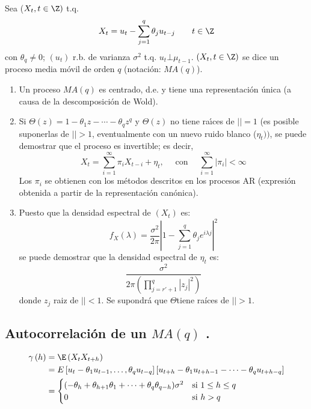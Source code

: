\begin{definicion}
Sea ($X_{t}, t\in \Z)$ t.q.
\[
X_{t} =u_{t} -\sum_{j=1}^q {\theta_{j} u_{t-j} } 
\qquad
t\in \Z
\]
con $\theta_{q} \ne 0$; $\left( {u_{t} } \right)$ r.b. de varianza $\sigma^{2}$ t.q. $u_{t} \bot \mu_{t-1} $. $\left( {X_{t} ,t\in \Z} \right)$ se dice un proceso media m\'{o}vil de orden $q$ (notaci\'{o}n: $MA(q)$).
\end{definicion}

\begin{observacion}
\quad 
\begin{enumerate}
\item Un proceso $MA(q)$ es centrado, d.e. y tiene una representaci\'{o}n \'{u}nica (a causa de la descomposici\'{o}n de Wold).

\item Si $\Theta \left( z \right)=1-\theta_{1} z-\cdots-\theta_{q} z^{q}$ y $\Theta (z)$ no tiene ra\'{\i}ces de $\left| \right|=1$ (es posible suponerlas de $\left| \right|>1$, eventualmente con un nuevo ruido blanco ($\eta_{t}))$, se puede demostrar que el proceso es invertible; es decir,
\[
X_{t}=\sum_{i=1}^\infty {\pi_{i}X_{t-i}} +\eta_{t},  \quad\text{ con }\quad  \sum_{i=1}^\infty \left| 
\pi_{i} \right| <\infty  
\]
Los $\pi_{i}$ se obtienen con los m\'{e}todos descritos en los procesos AR (expresi\'{o}n obtenida a partir de la representaci\'{o}n can\'{o}nica).

\item Puesto que la densidad espectral de $(X_{{t}})$ es:
\[
f_{X} \left( \lambda \right)=\frac{\sigma^{2}}{2\pi }\left| {1-\sum_{j=1}^q {\theta_{j} e^{i\lambda j}} } \right|^{2}
\]
se puede demostrar que la densidad espectral de $\eta_{t}$ es:
\[
\frac{\sigma^{2}}{2\pi \left( {\prod_{j={r}'+1}^{q} \left| 
{z_{j} } \right|^{2}} \right)}
\]
donde $z_{j}$ raiz de $\left| \right|<1$. Se supondr\'{a} que $\Theta $tiene ra\'{i}ces de $\left| \right|>1$. 
\end{enumerate}
\end{observacion}

\subsection{Autocorrelaci\'{o}n de un $MA(q)$ .}
\begin{align*}
\gamma \left( h \right)
	 &=\E\left( {X_{t} X_{t+h} } \right)\\
	 &=E\left[ {u_{t} -\theta_{1} u_{t-1} ,\ldots,\theta_{q} u_{t-q} } \right]\left[ {u_{t+h} -\theta_{1} u_{t+h-1} -\dots-\theta_{q} u_{t+h-q} } \right]\\
	 &=\begin{cases}
	    (-\theta_{h} +\theta_{h+1} \theta_{1} +\cdots+\theta_{q} \theta_{q-h})\sigma^{2} & \text{si }1\le h\le q \\ 
	    0 & \text{si } h>q
	   \end{cases}
\end{align*}

